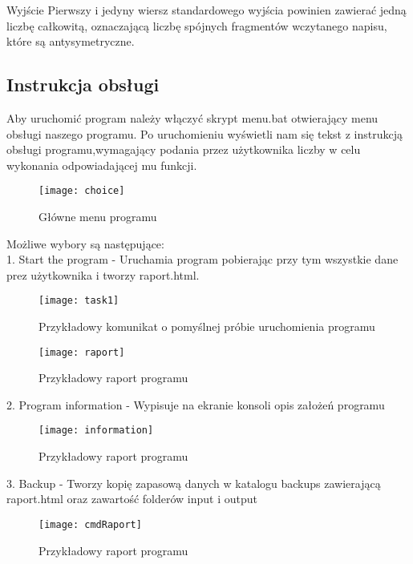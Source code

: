 \documentclass[12pt,a4paper]{article}
\begin{document}
Wyjście
Pierwszy i jedyny wiersz standardowego wyjścia powinien zawierać jedną liczbę całkowitą, oznaczającą liczbę spójnych fragmentów wczytanego napisu, które są antysymetryczne.

	\subsection*{Instrukcja obsługi}

	Aby uruchomić program należy włączyć skrypt menu.bat otwierający menu obsługi naszego programu.
 Po uruchomieniu wyświetli nam się tekst z instrukcją obsługi programu,wymagający podania przez użytkownika liczby w celu wykonania odpowiadającej mu funkcji.
 
 \begin{figure}[h]
    \centering
    \texttt{[image: choice]}
    \caption{Główne menu programu}
\end{figure}



Możliwe wybory są następujące:
\\1. Start the program - Uruchamia program pobierając przy tym wszystkie dane prez użytkownika i tworzy raport.html.

 \begin{figure}[h]
    \centering
    \texttt{[image: task1]}
    \caption{ Przykładowy komunikat o pomyślnej próbie uruchomienia programu}
\end{figure}

 \begin{figure}[h]
    \centering
    \texttt{[image: raport]}
    \caption{Przykładowy raport programu}
\end{figure}

2. Program information - Wypisuje na ekranie konsoli opis założeń programu

 \begin{figure}[!h]
    \centering
    \texttt{[image: information]}
    \caption{Przykładowy raport programu}
\end{figure}

3. Backup - Tworzy kopię zapasową danych w katalogu backups zawierającą raport.html oraz zawartość folderów input i output

\begin{figure}[htp]
    \centering
    \texttt{[image: cmdRaport]}
    \caption{Przykładowy raport programu}
\end{figure}
\end{document}
